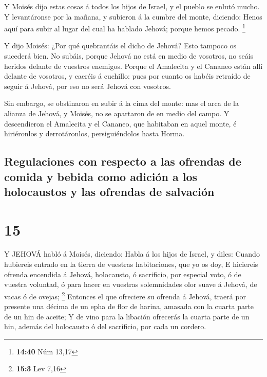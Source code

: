  Y Moisés dijo estas cosas á todos los hijos de Israel, y
el pueblo se enlutó mucho.  Y levantáronse por la mañana, y
subieron á la cumbre del monte, diciendo: Henos aquí para subir al lugar
del cual ha hablado Jehová; porque hemos pecado. \footnote{\textbf{14:40}
  Núm 13,17}

 Y dijo Moisés: ¿Por qué quebrantáis el dicho de Jehová?
Esto tampoco os sucederá bien.  No subáis, porque Jehová no
está en medio de vosotros, no seáis heridos delante de vuestros
enemigos.  Porque el Amalecita y el Cananeo están allí
delante de vosotros, y caeréis á cuchillo: pues por cuanto os habéis
retraído de seguir á Jehová, por eso no será Jehová con vosotros.

 Sin embargo, se obstinaron en subir á la cima del monte:
mas el arca de la alianza de Jehová, y Moisés, no se apartaron de en
medio del campo.  Y descendieron el Amalecita y el Cananeo,
que habitaban en aquel monte, é hiriéronlos y derrotáronlos,
persiguiéndolos hasta Horma.

\hypertarget{regulaciones-con-respecto-a-las-ofrendas-de-comida-y-bebida-como-adiciuxf3n-a-los-holocaustos-y-las-ofrendas-de-salvaciuxf3n}{%
\subsection{Regulaciones con respecto a las ofrendas de comida y bebida
como adición a los holocaustos y las ofrendas de
salvación}\label{regulaciones-con-respecto-a-las-ofrendas-de-comida-y-bebida-como-adiciuxf3n-a-los-holocaustos-y-las-ofrendas-de-salvaciuxf3n}}

\hypertarget{section-14}{%
\section{15}\label{section-14}}

 Y JEHOVÁ habló á Moisés, diciendo:  Habla á los
hijos de Israel, y diles: Cuando hubiereis entrado en la tierra de
vuestras habitaciones, que yo os doy,  E hiciereis ofrenda
encendida á Jehová, holocausto, ó sacrificio, por especial voto, ó de
vuestra voluntad, ó para hacer en vuestras solemnidades olor suave á
Jehová, de vacas ó de ovejas; \footnote{\textbf{15:3} Lev 7,16}
 Entonces el que ofreciere su ofrenda á Jehová, traerá por
presente una décima de un epha de flor de harina, amasada con la cuarta
parte de un hin de aceite;  Y de vino para la libación
ofrecerás la cuarta parte de un hin, además del holocausto ó del
sacrificio, por cada un cordero.

